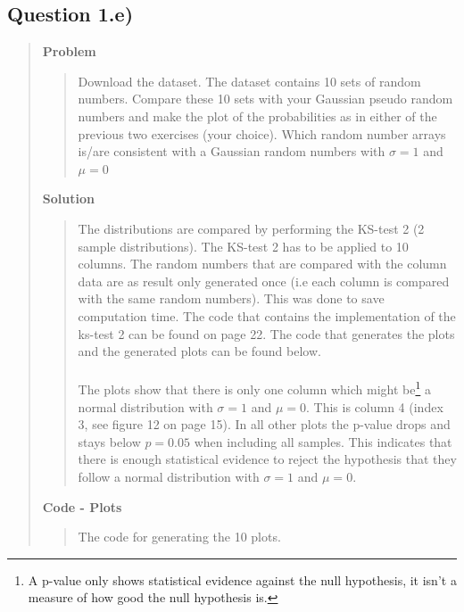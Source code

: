 
\subsection*{\textbf{Question 1.e)}}
\begin{quote}

\textbf{Problem}
\begin{quote}
Download the dataset. The dataset contains 10 sets of random numbers. Compare these 10 sets with your Gaussian pseudo random numbers and make the plot of the probabilities as in either of the previous two exercises (your choice). Which random number arrays is/are consistent with a Gaussian random numbers with $\sigma = 1$ and $\mu = 0$
\end{quote}

\textbf{Solution} 
\begin{quote}
The distributions are compared by performing the KS-test 2 (2 sample distributions). The KS-test 2 has to be applied to 10 columns. The random numbers that are compared with the column data are as result only generated once (i.e each column is  compared with the same random numbers). This was done to save computation time.  The code that contains the implementation of the ks-test 2 can be found on page 22.  The code that generates the plots and the generated plots can be found below.
\\
\\
The plots show that there is only one column which might be\footnote{A p-value only shows statistical evidence against the null hypothesis, it isn't a measure of how good the null hypothesis is.} a normal distribution with $\sigma = 1$ and $\mu = 0$. This is column 4 (index 3, see figure 12 on page 15). In all other plots the p-value drops and stays below $ p = 0.05$ when including all samples. This indicates that there is enough statistical evidence to reject the hypothesis that they follow a normal distribution with $\sigma = 1$ and $\mu = 0$. 

\end{quote}
\newpage

\textbf{Code - Plots}

\begin{quote}
The code for generating the 10 plots. 

\end{quote}
\newpage



\end{quote}
